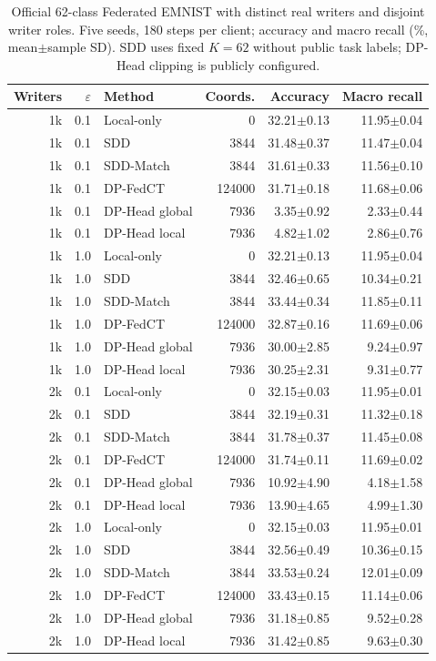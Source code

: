 \begin{table}[t]
\caption{Official 62-class Federated EMNIST with distinct real writers and disjoint writer roles. Five seeds, 180 steps per client; accuracy and macro recall (\%, mean$\pm$sample SD). SDD uses fixed $K=62$ without public task labels; DP-Head clipping is publicly configured.}
\label{tab:natural-full}\small
\centering
\begin{tabular}{@{}rrlrrr@{}}\toprule
Writers & $\varepsilon$ & Method & Coords. & Accuracy & Macro recall \\
\midrule
1k & 0.1 & Local-only & 0 & 32.21$\pm$0.13 & 11.95$\pm$0.04 \\
1k & 0.1 & SDD & 3844 & 31.48$\pm$0.37 & 11.47$\pm$0.04 \\
1k & 0.1 & SDD-Match & 3844 & 31.61$\pm$0.33 & 11.56$\pm$0.10 \\
1k & 0.1 & DP-FedCT & 124000 & 31.71$\pm$0.18 & 11.68$\pm$0.06 \\
1k & 0.1 & DP-Head global & 7936 & 3.35$\pm$0.92 & 2.33$\pm$0.44 \\
1k & 0.1 & DP-Head local & 7936 & 4.82$\pm$1.02 & 2.86$\pm$0.76 \\
1k & 1.0 & Local-only & 0 & 32.21$\pm$0.13 & 11.95$\pm$0.04 \\
1k & 1.0 & SDD & 3844 & 32.46$\pm$0.65 & 10.34$\pm$0.21 \\
1k & 1.0 & SDD-Match & 3844 & 33.44$\pm$0.34 & 11.85$\pm$0.11 \\
1k & 1.0 & DP-FedCT & 124000 & 32.87$\pm$0.16 & 11.69$\pm$0.06 \\
1k & 1.0 & DP-Head global & 7936 & 30.00$\pm$2.85 & 9.24$\pm$0.97 \\
1k & 1.0 & DP-Head local & 7936 & 30.25$\pm$2.31 & 9.31$\pm$0.77 \\
2k & 0.1 & Local-only & 0 & 32.15$\pm$0.03 & 11.95$\pm$0.01 \\
2k & 0.1 & SDD & 3844 & 32.19$\pm$0.31 & 11.32$\pm$0.18 \\
2k & 0.1 & SDD-Match & 3844 & 31.78$\pm$0.37 & 11.45$\pm$0.08 \\
2k & 0.1 & DP-FedCT & 124000 & 31.74$\pm$0.11 & 11.69$\pm$0.02 \\
2k & 0.1 & DP-Head global & 7936 & 10.92$\pm$4.90 & 4.18$\pm$1.58 \\
2k & 0.1 & DP-Head local & 7936 & 13.90$\pm$4.65 & 4.99$\pm$1.30 \\
2k & 1.0 & Local-only & 0 & 32.15$\pm$0.03 & 11.95$\pm$0.01 \\
2k & 1.0 & SDD & 3844 & 32.56$\pm$0.49 & 10.36$\pm$0.15 \\
2k & 1.0 & SDD-Match & 3844 & 33.53$\pm$0.24 & 12.01$\pm$0.09 \\
2k & 1.0 & DP-FedCT & 124000 & 33.43$\pm$0.15 & 11.14$\pm$0.06 \\
2k & 1.0 & DP-Head global & 7936 & 31.18$\pm$0.85 & 9.52$\pm$0.28 \\
2k & 1.0 & DP-Head local & 7936 & 31.42$\pm$0.85 & 9.63$\pm$0.30 \\
\bottomrule\end{tabular}
\end{table}
